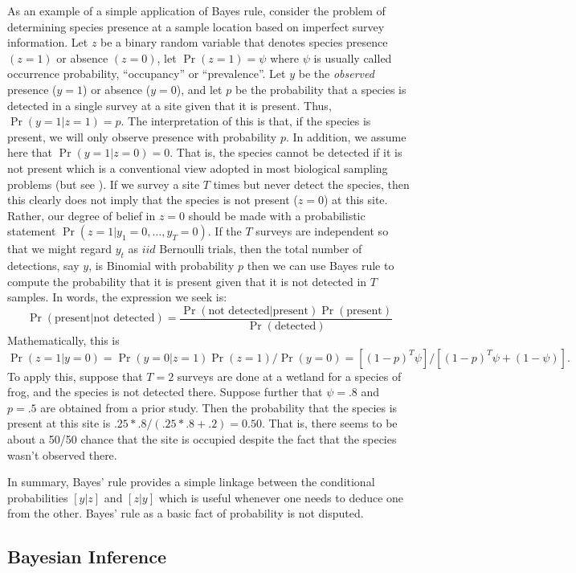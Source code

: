 As an example of a simple application of Bayes rule,
consider the problem of determining species presence at a sample
location based on imperfect survey information. Let $z$ be a binary
random variable that denotes species presence $(z=1)$ or absence
$(z=0)$, let $\Pr(z=1) = \psi$ where $\psi$ is usually called
occurrence probability, ``occupancy'' \citep{mackenzie_etal:2002} or ``prevalence''. 
Let $y$ be the {\it observed} presence
($y=1$) or absence ($y=0$), and let $p$ be the probability that a
species is detected in a single survey at a site given that it is
present. Thus, $\Pr(y=1|z=1)=p$. The interpretation of this is that,
if the species is present, we will only observe presence with
probability $p$. In addition, we assume here that $\Pr(y=1|z=0) =
0$. That is, the species cannot be detected if it is not present which
is a conventional view adopted in most biological sampling problems (but
see \citet{royle_link:2006}).
If we survey a site $T$ times but never detect the species,
then this clearly does not imply that the species is not present
($z=0$) at this site. Rather, our degree of belief in $z=0$ should be
made with a probabilistic statement
$\Pr(z=1|y_1=0,\ldots,y_{T}=0)$. If the $T$ surveys are independent so
that we might regard $y_{t}$ as $iid$ Bernoulli trials, then the total
number of detections, say $y$, is Binomial with probability $p$ then
we can use Bayes rule to compute the probability that it is present
given that it is not detected in $T$ samples. In words, the expression
we seek is:
\[
\Pr(\mbox{present} | \mbox{not detected}) = \frac{\Pr(\mbox{not detected} |
  \mbox{present})\Pr(\mbox{present})}{\Pr(\mbox{detected})}
\]
Mathematically, this is 
\[
\Pr(z=1|y=0) = \Pr(y=0|z=1)\Pr(z=1)/\Pr(y=0) = 
[(1-p)^{T} \psi]/[ (1-p)^T \psi + (1-\psi) ].
\]
To apply this, 
suppose that $T=2$ surveys are done at a wetland for a species of
frog, and the species is not detected there. Suppose further that $\psi
= .8$ and $p = .5$ are obtained from a prior study.  Then the
probability that the species is present at this site is
$.25*.8/(.25*.8 + .2) = 0.50$. That is, there seems to be about a
50/50 chance that the site is occupied despite the fact that the
species wasn't observed there.

In summary, Bayes' rule provides a simple linkage between the
conditional probabilities $[y|z]$ and $[z|y]$ which is useful whenever
one needs to deduce one from the other. 
Bayes' rule as a basic fact of probability is not disputed. 


\subsection{Bayesian Inference}


